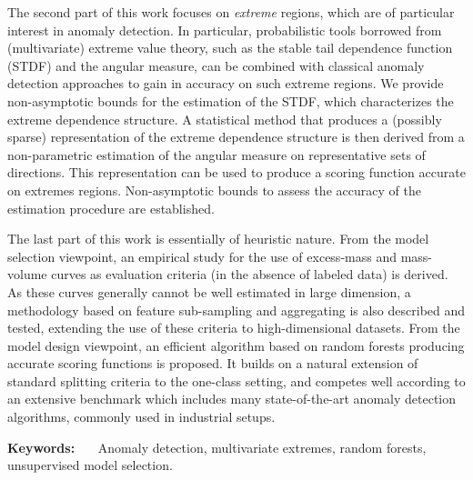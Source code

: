 \documentclass[a4paper, 8pt]{article}
\begin{document}
The second part of this work focuses on \emph{extreme} regions, which are of particular interest in anomaly detection. In particular, probabilistic tools borrowed from (multivariate) extreme value theory, such as the stable tail dependence function (STDF) and the angular measure, can be combined with classical anomaly detection approaches to gain in accuracy on such extreme regions. We provide non-asymptotic bounds for the estimation of the STDF, which characterizes the extreme dependence structure. A statistical method that produces a (possibly sparse) representation of the extreme dependence structure is then derived from a non-parametric estimation of the angular measure on representative sets of directions. This representation can be used to produce a scoring function accurate on extremes regions. Non-asymptotic bounds to assess the accuracy of the estimation procedure are established.

The last part of this work is essentially of heuristic nature. From the model selection viewpoint, an empirical study for the use of excess-mass and mass-volume curves as evaluation criteria (in the absence of labeled data) is derived. As these curves generally cannot be well estimated in large dimension, a methodology based on feature sub-sampling and aggregating is also described and tested, extending the use of these criteria to high-dimensional datasets. From the model design viewpoint, an efficient algorithm based on random forests producing accurate scoring functions is proposed. It builds on a natural extension of standard splitting criteria to the one-class setting, and competes well according to an extensive benchmark which includes many state-of-the-art anomaly detection algorithms, commonly used in industrial setups.

\vspace{0.5em}

\textbf{Keywords:} ~~~Anomaly detection, multivariate extremes, random forests, unsupervised model selection.


\end{document}
